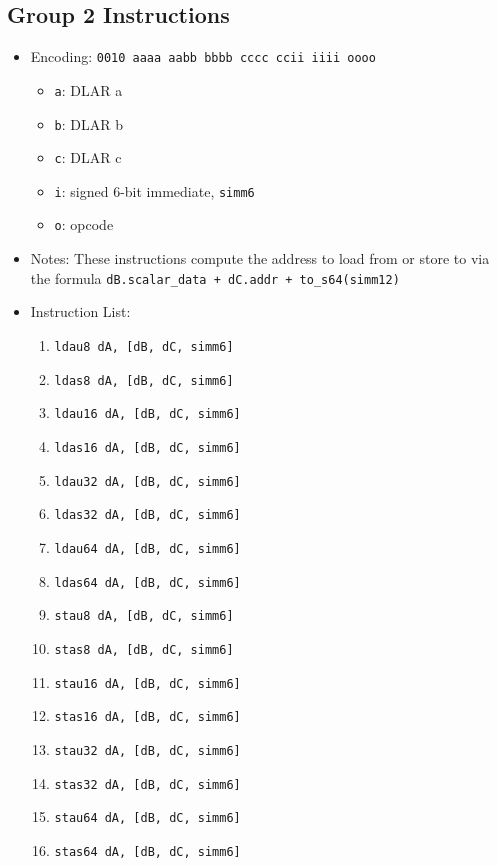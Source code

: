 \documentclass{article}
\begin{document}
	\subsection{Group 2 Instructions}
		\begin{itemize}
		\item Encoding:  \texttt{0010 aaaa aabb bbbb  cccc ccii iiii oooo}
			\begin{itemize}
			\item \texttt{a}:  DLAR a
			\item \texttt{b}:  DLAR b
			\item \texttt{c}:  DLAR c
			\item \texttt{i}:  signed 6-bit immediate, \texttt{simm6}
			\item \texttt{o}:  opcode
			\end{itemize}
		\item Notes:
			These instructions compute the address to load from or store to
			via the formula
			\texttt{dB.scalar\_data + dC.addr + to\_s64(simm12)}
		\item Instruction List:
			\begin{enumerate}
			\item \texttt{ldau8 dA, [dB, dC, simm6]}
			\item \texttt{ldas8 dA, [dB, dC, simm6]}
			\item \texttt{ldau16 dA, [dB, dC, simm6]}
			\item \texttt{ldas16 dA, [dB, dC, simm6]}

			\item \texttt{ldau32 dA, [dB, dC, simm6]}
			\item \texttt{ldas32 dA, [dB, dC, simm6]}
			\item \texttt{ldau64 dA, [dB, dC, simm6]}
			\item \texttt{ldas64 dA, [dB, dC, simm6]}

			\item \texttt{stau8 dA, [dB, dC, simm6]}
			\item \texttt{stas8 dA, [dB, dC, simm6]}
			\item \texttt{stau16 dA, [dB, dC, simm6]}
			\item \texttt{stas16 dA, [dB, dC, simm6]}

			\item \texttt{stau32 dA, [dB, dC, simm6]}
			\item \texttt{stas32 dA, [dB, dC, simm6]}
			\item \texttt{stau64 dA, [dB, dC, simm6]}
			\item \texttt{stas64 dA, [dB, dC, simm6]}
			\end{enumerate}
		\end{itemize}
\end{document}
